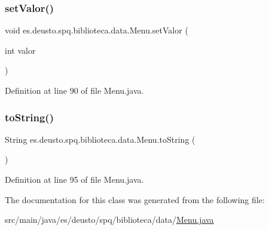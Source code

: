 \subsubsection{\texorpdfstring{set\+Valor()}{setValor()}}
{\footnotesize\ttfamily void es.\+deusto.\+spq.\+biblioteca.\+data.\+Menu.\+set\+Valor (\begin{DoxyParamCaption}\item[{int}]{valor }\end{DoxyParamCaption})}



Definition at line 90 of file Menu.\+java.

\mbox{\label{classes_1_1deusto_1_1spq_1_1biblioteca_1_1data_1_1_menu_a3385f0a3f0088252e92ba4ec820b7649}} 
\subsubsection{\texorpdfstring{to\+String()}{toString()}}
{\footnotesize\ttfamily String es.\+deusto.\+spq.\+biblioteca.\+data.\+Menu.\+to\+String (\begin{DoxyParamCaption}{ }\end{DoxyParamCaption})}



Definition at line 95 of file Menu.\+java.



The documentation for this class was generated from the following file\+:\begin{DoxyCompactItemize}
\item 
src/main/java/es/deusto/spq/biblioteca/data/\mbox{\hyperlink{_menu_8java}{Menu.\+java}}\end{DoxyCompactItemize}
